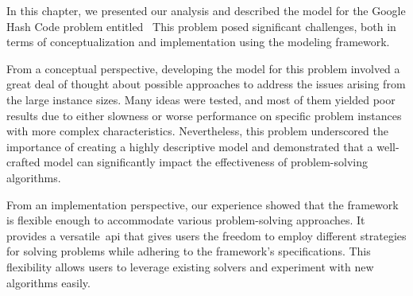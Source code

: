 In this chapter, we presented our analysis and described the model for the
Google Hash Code problem entitled~
This problem posed significant challenges, both in terms of conceptualization
and implementation using the modeling framework.

From a conceptual perspective, developing the model for this problem involved a
great deal of thought about possible approaches to address the issues arising
from the large instance sizes. Many ideas were tested, and most of them yielded
poor results due to either slowness or worse performance on specific problem
instances with more complex characteristics. Nevertheless, this problem
underscored the importance of creating a highly descriptive model and
demonstrated that a well-crafted model can significantly impact the
effectiveness of problem-solving algorithms.

From an implementation perspective, our experience showed that the framework is
flexible enough to accommodate various problem-solving approaches. It provides a
versatile~\acrshort{api} that gives users the freedom to employ different strategies for
solving problems while adhering to the framework's specifications. This
flexibility allows users to leverage existing solvers and experiment with new
algorithms easily.
